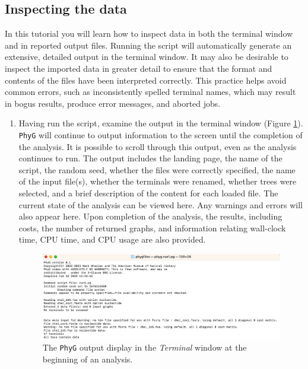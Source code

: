 \documentclass[]{article}
\newcommand{\phyg}{\texttt{PhyG} }
\begin{document}
\subsection{Inspecting the data}
\label{subsec:Inspecting}

In this tutorial you will learn how to inspect data in both the terminal window and 
in reported output files. Running the script will automatically generate an extensive, 
detailed output in the terminal window. It may also be desirable to inspect the 
imported data in greater detail to ensure that the format and contents of the files 
have been interpreted correctly. This practice helps avoid common errors, such 
as inconsistently spelled terminal names, which may result in bogus results, 
produce error messages, and aborted jobs.

\begin{enumerate}

\item Having run the script, examine the output in the terminal window 
(Figure \ref{output1}). \phyg will continue to output information to the screen 
until the completion of the analysis. It is possible to scroll through this output, 
even as the analysis continues to run. The output includes the landing page, 
the name of the script, the random seed, whether the files were 
correctly specified, the name of the input file(s), whether the terminals were 
renamed, whether trees were selected, and a brief description of the content 
for each loaded file. The current state of the analysis can be viewed here. Any 
warnings and errors will also appear here. Upon completion of the analysis, the 
results, including costs, the number of returned graphs, and information relating 
wall-clock time, CPU time, and CPU usage are also provided.

\begin{figure}
\centering
\includegraphics[width=\textwidth]{output1.png}
\caption{The \phyg output display in the \textit{Terminal} window at the beginning 
of an analysis.}
\label{output1}
\end{figure}


\end{enumerate}
\end{document}
